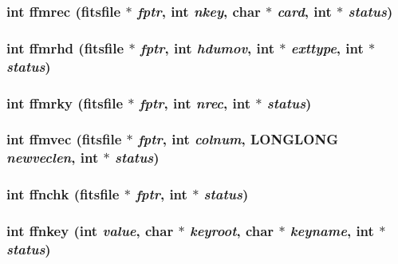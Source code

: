 \subsubsection{\setlength{\rightskip}{0pt plus 5cm}int ffmrec (\bf{fitsfile} $\ast$ {\em fptr}, int {\em nkey}, char $\ast$ {\em card}, int $\ast$ {\em status})}\label{fitsio_8h_64f0b7aa1396fb5dc63502db966f8acd}


\subsubsection{\setlength{\rightskip}{0pt plus 5cm}int ffmrhd (\bf{fitsfile} $\ast$ {\em fptr}, int {\em hdumov}, int $\ast$ {\em exttype}, int $\ast$ {\em status})}\label{fitsio_8h_d81f4e1c55fec210faa6343d3ed455ce}


\subsubsection{\setlength{\rightskip}{0pt plus 5cm}int ffmrky (\bf{fitsfile} $\ast$ {\em fptr}, int {\em nrec}, int $\ast$ {\em status})}\label{fitsio_8h_d22c9244b2bef12cd893ff4e514f49fb}


\subsubsection{\setlength{\rightskip}{0pt plus 5cm}int ffmvec (\bf{fitsfile} $\ast$ {\em fptr}, int {\em colnum}, \bf{LONGLONG} {\em newveclen}, int $\ast$ {\em status})}\label{fitsio_8h_4d65fa6c7cdfb529d91ceeed740985b3}


\subsubsection{\setlength{\rightskip}{0pt plus 5cm}int ffnchk (\bf{fitsfile} $\ast$ {\em fptr}, int $\ast$ {\em status})}\label{fitsio_8h_3045d84f13f392c7d7600c5d734f4db7}


\subsubsection{\setlength{\rightskip}{0pt plus 5cm}int ffnkey (int {\em value}, char $\ast$ {\em keyroot}, char $\ast$ {\em keyname}, int $\ast$ {\em status})}\label{fitsio_8h_246d87f69e3a02a1105b9013ca8f4409}


